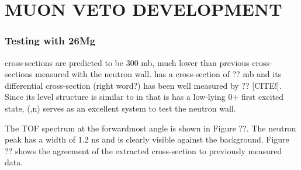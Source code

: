 %
%
%
%
%
%
%
%

%
%

\chapter{MUON VETO DEVELOPMENT}
\label{chap:muVeto}

\subsection{Testing with 26Mg}

\GeTargets cross-sections are predicted to be 300 mb, much lower than previous cross-sections measured with the neutron wall.   has a cross-section of ?? mb and its differential cross-section (right word?) has been well measured by ?? [CITE!].  Since its level structure is similar to \GeTargets in that is has a low-lying 0+ first excited state, (,n) serves as an excellent system to test the neutron wall.


The TOF spectrum at the forwardmost angle is shown in Figure ??.  The neutron peak has a width of 1.2 ns and is clearly visible against the background.  Figure ?? shows the agreement of the extracted cross-section to previously measured data.


